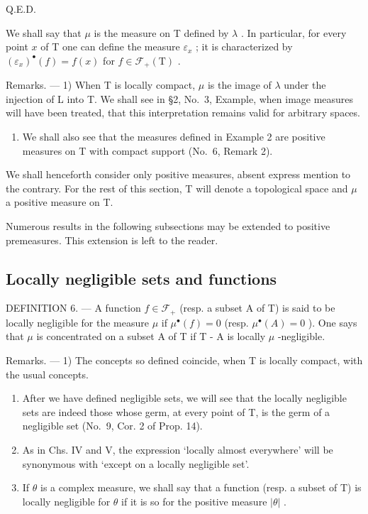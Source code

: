 Q.E.D.

We shall say that \(\mu\) is the measure on T defined by \(\lambda\) . In particular, for every point \(x\) of T one can define the measure \(\varepsilon_x\) ; it is characterized by \((\varepsilon_x)^{\bullet}(f) = f(x)\) for \(f \in \mathcal{F}_{+}(\mathrm{T})\) .

Remarks. --- 1) When T is locally compact, \(\mu\) is the image of \(\lambda\) under the injection of L into T. We shall see in §2, No.~3, Example, when image measures will have been treated, that this interpretation remains valid for arbitrary spaces.

\begin{enumerate}
\def\labelenumi{\arabic{enumi})}
\setcounter{enumi}{1}
\tightlist
\item
  We shall also see that the measures defined in Example 2 are positive measures on T with compact support (No.~6, Remark 2).
\end{enumerate}

We shall henceforth consider only positive measures, absent express mention to the contrary. For the rest of this section, T will denote a topological space and \(\mu\) a positive measure on T.

Numerous results in the following subsections may be extended to positive premeasures. This extension is left to the reader.

\subsection{Locally negligible sets and functions}

DEFINITION 6. --- A function \(f \in \mathcal{F}_{+}\) (resp. a subset A of T) is said to be locally negligible for the measure \(\mu\) if \(\mu^{\bullet}(f) = 0\) (resp. \(\mu^{\bullet}(A) = 0\) ). One says that \(\mu\) is concentrated on a subset A of T if T - A is locally \(\mu\) -negligible.

Remarks. --- 1) The concepts so defined coincide, when T is locally compact, with the usual concepts.

\begin{enumerate}
\def\labelenumi{\arabic{enumi})}
\setcounter{enumi}{1}
\item
  After we have defined negligible sets, we will see that the locally negligible sets are indeed those whose germ, at every point of T, is the germ of a negligible set (No.~9, Cor. 2 of Prop. 14).
\item
  As in Chs. IV and V, the expression `locally almost everywhere' will be synonymous with `except on a locally negligible set'.
\item
  If \(\theta\) is a complex measure, we shall say that a function (resp. a subset of T) is locally negligible for \(\theta\) if it is so for the positive measure \(|\theta|\) .
\end{enumerate}

